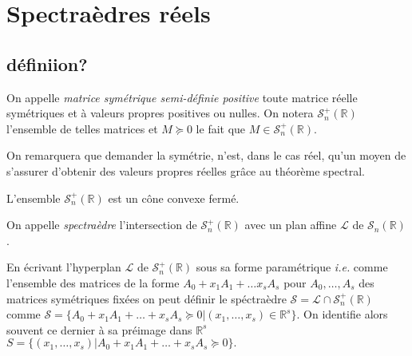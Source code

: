 \section{Spectraèdres réels}

\newcommand\ssp{symétrique semi-définie positive}
\newcommand\ssps{symétriques semi-définies positives}
\newcommand\Ssp{Symétrique semi-définie positive}
\newcommand\Ssps{Symétriques semi-définies positives}

\subsection{définiion?}

\begin{definition}
	On appelle \emph{matrice symétrique semi-définie positive} toute matrice réelle symétriques et à valeurs propres positives ou nulles.
	On notera $\mathcal{S}_n^+\left(\mathbb{R}\right) $ l'ensemble de telles matrices et $M \succeq 0$ le fait que $M \in \mathcal{S}_n^+\left(\mathbb{R}\right)$.
\end{definition}

\begin{remarque}
	On remarquera que demander la symétrie, n'est, dans le cas réel, qu'un moyen de s'assurer d'obtenir des valeurs propres réelles grâce au théorème spectral.
\end{remarque}
\begin{propriete}
	L'ensemble $\mathcal{S}_n^+\left( \mathbb{R} \right) $ est un cône convexe fermé.
\end{propriete}

\begin{definition}
	On appelle \emph{spectraèdre} l'intersection de $\mathcal{S}_n^+\left(\mathbb{R}\right)$ avec un plan affine $\mathcal{L}$ de $\mathcal{S}_n\left(\mathbb{R}\right)$.
\end{definition}

En écrivant l'hyperplan $\mathcal{L}$ de $\mathcal{S}_n^+\left(\mathbb{R}\right)$ sous sa forme paramétrique \textit{i.e.} comme l'ensemble des matrices de la forme $A_0 + x_1 A_1 + \ldots x_s A_s$ pour $A_0,\ldots, A_s$ des matrices symétriques fixées on peut définir le spéctraèdre $\mathcal{S} = \mathcal{L} \cap \mathcal{S}_n^+\left(\mathbb{R}\right)$ comme $\mathcal{S} = \{A_0 + x_1A_1 + \ldots + x_s A_s \succeq 0| (x_1,\ldots,x_s) \in \mathbb{R}^s\} $. On identifie alors souvent ce dernier à sa préimage dans $\mathbb{R}^s$ $S = \{(x_1,\ldots,x_s) | A_0+ x_1A_1 + \ldots+ x_s A_s \succeq 0 \}. $

